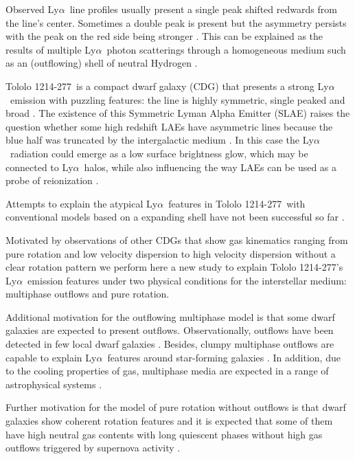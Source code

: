 \documentclass[a4paper,fleqn,usenatbib]{mnras}
\newcommand{\tol}{Tololo 1214-277}
\newcommand{\lya}{\ifmmode{{\rm Ly}\alpha}\else Ly$\alpha$\ \fi}
\begin{document}
Observed \lya line profiles usually present a single peak shifted
redwards from the line's center. 
Sometimes a double peak is present but the asymmetry persists with 
the peak on the red side being stronger \citep[e.g.][]{2010ApJ...717..289S,Erb14,Trainor16}. 
This can be explained as the results of multiple \lya photon
scatterings through a homogeneous medium such as an (outflowing) shell of neutral Hydrogen
\citep{2006A&A...460..397V,Orsi12,2012ApJ...751...29Y,2015ApJ...812..123G}.

\tol\ is a compact dwarf galaxy (CDG) that presents a
strong \lya emission with puzzling 
features: the line is highly symmetric, single peaked and broad 
\citep{Thuan97}.
The existence of this Symmetric Lyman Alpha Emitter (SLAE) raises the question whether some high
redshift LAEs have asymmetric lines because the blue half was
truncated by the intergalactic medium \citep{2007MNRAS.377.1175D}. 
In this case the \lya radiation could emerge as a low surface
brightness glow, which may be connected to \lya halos, while also
influencing the way LAEs can be used as a probe of reionization
\citep[see the review by][and references therein]{2014PASA...31...40D}. 

Attempts to explain the atypical \lya features in \tol\ with
conventional models based on a expanding shell have not been successful
so far \citep{mashesse03,2015A&A...578A...7V}. 


Motivated by observations of other CDGs
  that show gas kinematics ranging from pure rotation and low velocity
dispersion to high velocity dispersion without a clear rotation pattern
\citep{2015A&A...577A..21C,2017arXiv170809407C,2017A&A...600A.125C}
we perform here a new study to explain \tol's \lya emission features under two physical
conditions for the interstellar medium: multiphase outflows and pure rotation.


Additional motivation for the outflowing multiphase model \citep[as presented
in][]{Gronke2016} is that some dwarf galaxies are expected to
present outflows.  
Observationally, outflows have been detected in few local dwarf galaxies
\citep{1998ApJ...506..222M,2005MNRAS.358.1453O}. 
Besides, clumpy multiphase outflows are capable to explain \lya features around
star-forming galaxies
\citep{2010ApJ...717..289S,2012MNRAS.424.1672D}.
In addition, due to the cooling properties of gas, multiphase media are expected
in a range of astrophysical systems
\citep[][]{1977ApJ...218..148M}. 

Further  motivation for the model of pure rotation without outflows 
\citep[as presented in][]{GaravitoCamargo2014} is that dwarf galaxies show coherent
rotation features  \citep{2009A&A...493..871S} and it is expected that
some of them have high neutral gas contents with long quiescent phases
without high gas outflows triggered by supernova activity
\citep{2005A&A...433L...1B,2008ApJ...672..888T,2013MNRAS.434.2491G}.   
\end{document}
